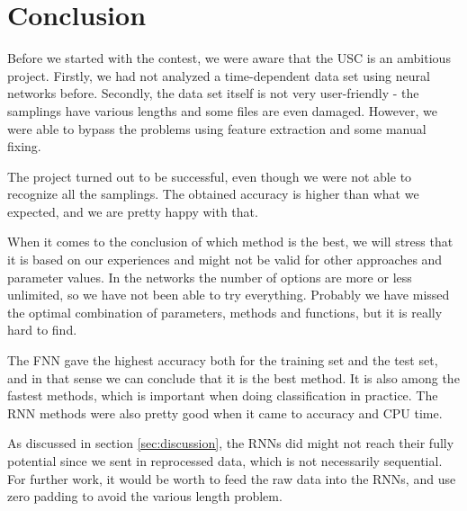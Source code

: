 \section{Conclusion} \label{sec:conclusion}
Before we started with the contest, we were aware that the USC is an ambitious project. Firstly, we had not analyzed a time-dependent data set using neural networks before. Secondly, the data set itself is not very user-friendly - the samplings have various lengths and some files are even damaged. However, we were able to bypass the problems using feature extraction and some manual fixing. 

The project turned out to be successful, even though we were not able to recognize all the samplings. The obtained accuracy is higher than what we expected, and we are pretty happy with that. 

When it comes to the conclusion of which method is the best, we will stress that it is based on our experiences and might not be valid for other approaches and parameter values. In the networks the number of options are more or less unlimited, so we have not been able to try everything. Probably we have missed the optimal combination of parameters, methods and functions, but it is really hard to find. 

The FNN gave the highest accuracy both for the training set and the test set, and in that sense we can conclude that it is the best method. It is also among the fastest methods, which is important when doing classification in practice. The RNN methods were also pretty good when it came to accuracy and CPU time.

As discussed in section \ref{sec:discussion}, the RNNs did might not reach their fully potential since we sent in reprocessed data, which is not necessarily sequential. For further work, it would be worth to feed the raw data into the RNNs, and use zero padding to avoid the various length problem.